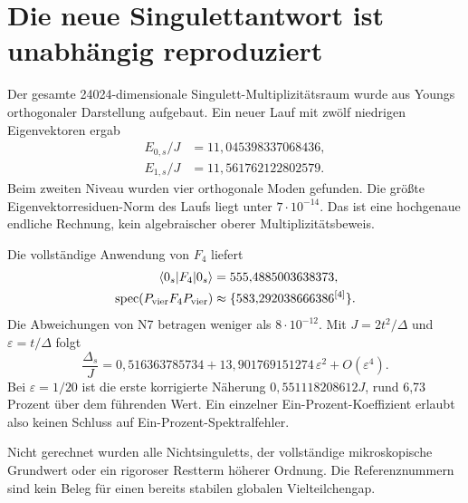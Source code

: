 \section{Die neue Singulettantwort ist unabhängig reproduziert}
Der gesamte 24024-dimensionale Singulett-Multiplizitätsraum wurde aus Youngs orthogonaler Darstellung aufgebaut. Ein neuer Lauf mit zwölf niedrigen Eigenvektoren ergab
\begin{align}
E_{0,s}/J&=11{,}045398337068436,\\
E_{1,s}/J&=11{,}561762122802579.
\end{align}
Beim zweiten Niveau wurden vier orthogonale Moden gefunden. Die größte Eigenvektorresiduen-Norm des Laufs liegt unter $7\cdot10^{-14}$. Das ist eine hochgenaue endliche Rechnung, kein algebraischer oberer Multiplizitätsbeweis.

Die vollständige Anwendung von $F_4$ liefert
\begin{align}
\langle0_s|F_4|0_s\rangle&=555{,}4885003638373,\\
\operatorname{spec}(P_{\mathrm{vier}}F_4P_{\mathrm{vier}})
&\approx\{583{,}292038666386^{[4]}\}.
\end{align}
Die Abweichungen von N7 betragen weniger als $8\cdot10^{-12}$. Mit $J=2t^2/\Delta$ und $\varepsilon=t/\Delta$ folgt
\begin{equation}
\frac{\Delta_s}{J}
=0{,}516363785734
+13{,}901769151274\,\varepsilon^2+O(\varepsilon^4).
\end{equation}
Bei $\varepsilon=1/20$ ist die erste korrigierte Näherung $0{,}551118208612J$, rund 6,73 Prozent über dem führenden Wert. Ein einzelner Ein-Prozent-Koeffizient erlaubt also keinen Schluss auf Ein-Prozent-Spektralfehler.

Nicht gerechnet wurden alle Nichtsinguletts, der vollständige mikroskopische Grundwert oder ein rigoroser Restterm höherer Ordnung. Die Referenznummern sind kein Beleg für einen bereits stabilen globalen Vielteilchengap.

